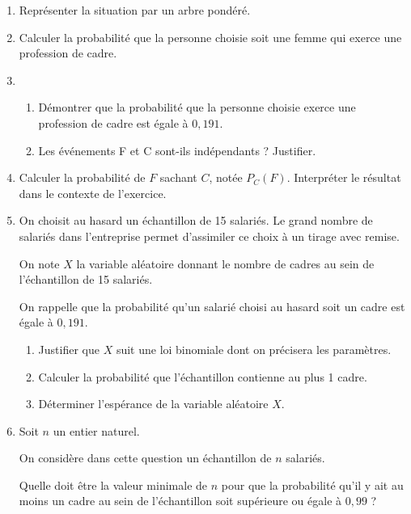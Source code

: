 \begin{enumerate}
	\item Représenter la situation par un arbre pondéré.
	\item Calculer la probabilité que la personne choisie soit une femme qui exerce une profession de cadre.
	\item 
	\begin{enumerate}
		\item Démontrer que la probabilité que la personne choisie exerce une profession de cadre est égale à $0,191$.
		\item Les événements F et C sont-ils indépendants ? Justifier.
	\end{enumerate}
	\item Calculer la probabilité de $F$ sachant $C$, notée $P_C(F)$. Interpréter le résultat dans le contexte de l'exercice.
	\item On choisit au hasard un échantillon de 15 salariés. Le grand nombre de salariés dans l'entreprise permet d'assimiler ce choix à un tirage avec remise.
	
	On note $X$ la variable aléatoire donnant le nombre de cadres au sein de l'échantillon de 15 salariés.
	
	On rappelle que la probabilité qu'un salarié choisi au hasard soit un cadre est égale à $0,191$.
	\begin{enumerate}
		\item Justifier que $X$ suit une loi binomiale dont on précisera les paramètres. 
		\item Calculer la probabilité que l'échantillon contienne au plus 1 cadre.
		\item Déterminer l'espérance de la variable aléatoire $X$.
	\end{enumerate}
	\item Soit $n$ un entier naturel.
	
	On considère dans cette question un échantillon de $n$ salariés.
	
	Quelle doit être la valeur minimale de $n$ pour que la probabilité qu'il y ait au moins un cadre au sein de l'échantillon soit supérieure ou égale à $0,99$ ?
\end{enumerate}

